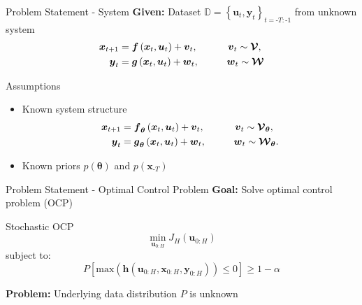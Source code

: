 \documentclass[student, noshadow, itr, english, aspectratio=169]{ITR_LSR_slides}
\begin{document}
\begin{frame}{Problem Statement - System}	
	\textbf{Given:} Dataset $\mathbb{D} = \left\{\boldsymbol{u}_{t}, \boldsymbol{y}_{t}\right\}_{t = \text{-}T:\text{-}1}$ from unknown system
	\begin{equation*}
	\begin{split}
	\boldsymbol{x}_{t+1} &= \boldsymbol{f} \left( \boldsymbol{x}_{t}, \boldsymbol{u}_t \right) + \boldsymbol{v}_{t}, \makebox[1cm]{\hfill} \; \boldsymbol{v}_{t} \sim \boldsymbol{\mathcal{V}},\\
	\boldsymbol{y}_{t} &= \boldsymbol{g} \left( \boldsymbol{x}_{t}, \boldsymbol{u}_t \right) + \boldsymbol{w}_{t}, \makebox[1cm]{\hfill} \boldsymbol{w}_{t} \sim \boldsymbol{\mathcal{W}}
	\end{split}
	\end{equation*}

	\begin{block}{Assumptions}
	\begin{itemize}
		\item 
		Known system structure
	\begin{equation*}
	\begin{split}
	\boldsymbol{x}_{t+1} &= \boldsymbol{f}_{\boldsymbol{\theta}} \left( \boldsymbol{x}_{t}, \boldsymbol{u}_t \right) + \boldsymbol{v}_{t}, \makebox[1cm]{\hfill} \; \boldsymbol{v}_{t} \sim \boldsymbol{\mathcal{V}}_{\boldsymbol{\theta}},\\
	\boldsymbol{y}_{t} &= \boldsymbol{g}_{\boldsymbol{\theta}} \left( \boldsymbol{x}_{t}, \boldsymbol{u}_t \right) + \boldsymbol{w}_{t}, \makebox[1cm]{\hfill} \boldsymbol{w}_{t} \sim \boldsymbol{\mathcal{W}}_{\boldsymbol{\theta}}.
	\end{split}
	\end{equation*}
	\item 
	Known priors $p(\boldsymbol{\theta})$ and $p(\boldsymbol{x}_{\text{-}T})$
	\end{itemize}
	\end{block}	


\end{frame}

\begin{frame}{Problem Statement - Optimal Control Problem}	
	\textbf{Goal:} Solve optimal control problem (OCP)\\
	\begin{block}{Stochastic OCP}
		\begin{equation*}
		\min\limits_{\boldsymbol{u}_{0:H}} J_H(\boldsymbol{u}_{0:H}) 
		\end{equation*}
		subject to: 
		\begin{equation*}
		P \left[  \text{max}(\boldsymbol{h}(\boldsymbol{u}_{0:H},  \boldsymbol{x}_{0:H},  \boldsymbol{y}_{0:H})) \leq 0 \right] \geq 1 - \alpha
		\end{equation*}
	\end{block}	
	\textbf{Problem:} Underlying data distribution $P$ is unknown
\end{frame}
\end{document}
